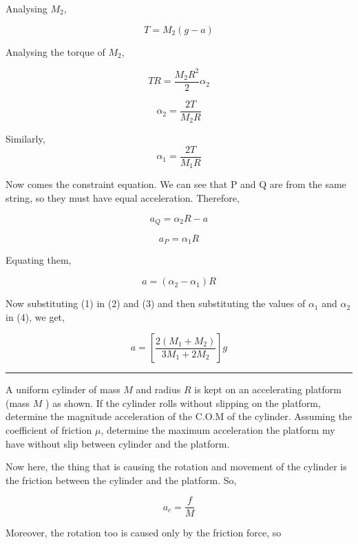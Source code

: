 \documentclass[twocolumn]{article}
\begin{document}
Analysing \(M_2\),

\[
    T = M_2 (g - a) \tag{1}
\]

Analysing the torque of \(M_2\), 

\[
    TR = \frac{M_2 R^{2}}{2} \alpha_2 
\]

\[
    \alpha_2 = \frac{2T}{M_2 R} \tag{2}
\]

Similarly, 
\[
    \alpha_1 = \frac{2T}{M_1 R} \tag{3}
\]

Now comes the constraint equation. We can see that P and Q are from the same string, so they must have equal acceleration. Therefore, 

\[
    a_{Q} = \alpha_2 R - a 
\]

\[
    a_{P} = \alpha_1 R 
\]

Equating them, 

\[
    a = (\alpha_2 - \alpha_1) R \tag{4}
\]

Now substituting (1) in (2) and (3) and then substituting the values of \(\alpha_1\) and \(\alpha_2\) in (4), we get, 

\[
    \boxed{a = [\frac{2(M_1 + M_2)}{3M_1 + 2M_2}]g}
\]

\vspace{0.1in}
\hrule

\begin{question}
    A uniform cylinder of mass \(M\) and radius \(R\) is kept on an accelerating platform (mass \(M\) ) as shown. If the cylinder rolls without slipping on the platform, determine the magnitude acceleration of the C.O.M of the cylinder. Assuming the coefficient of friction \(\mu\), determine the maximum acceleration the platform my have without slip between cylinder and the platform. 
    \begin{center}
    \end{center}
\end{question}

Now here, the thing that is causing the rotation and movement of the cylinder is the friction between the cylinder and the platform. So,

\[
    a_c = \frac{f}{M}
\]

Moreover, the rotation too is caused only by the friction force, so 
\end{document}

